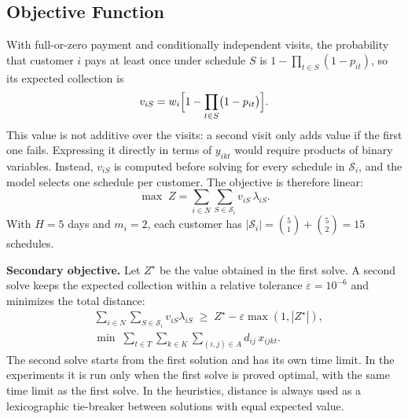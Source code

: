 \documentclass[11pt,a4paper]{article}
\begin{document}
\subsection{Objective Function}
With full-or-zero payment and conditionally independent visits, the
probability that customer $i$ pays at least once under schedule $S$ is
$1-\prod_{t\in S}(1-p_{it})$, so its expected collection is
\begin{equation}
v_{iS}=w_i\Bigl[1-\prod_{t\in S}\bigl(1-p_{it}\bigr)\Bigr].
\label{eq:schedule-value}
\end{equation}
This value is not additive over the visits: a second visit only adds value
if the first one fails. Expressing it directly in terms of $y_{ikt}$ would
require products of binary variables. Instead, $v_{iS}$ is computed before
solving for every schedule in $\mathcal S_i$, and the model selects one
schedule per customer. The objective is therefore linear:
\begin{equation}
\max\; Z=\sum_{i\in N}\sum_{S\in\mathcal S_i} v_{iS}\,\lambda_{iS}.
\label{eq:objective}
\end{equation}
With $H=5$ days and $m_i=2$, each customer has
$|\mathcal S_i|=\binom51+\binom52=15$ schedules.

\textbf{Secondary objective.} Let $Z^\star$ be the value obtained in the first
solve. A second solve keeps the expected collection within a relative
tolerance $\varepsilon=10^{-6}$ and minimizes the total distance:
\begin{align}
&\sum_{i\in N}\sum_{S\in\mathcal S_i} v_{iS}\lambda_{iS}
  \;\ge\; Z^\star-\varepsilon\max(1,|Z^\star|), \label{eq:lexi}\\
&\min\;\sum_{t\in T}\sum_{k\in K}\sum_{(i,j)\in A} d_{ij}\,x_{ijkt}.
  \label{eq:distance}
\end{align}
The second solve starts from the first solution and has its own time limit.
In the experiments it is run only when the first solve is proved optimal,
with the same time limit as the first solve. In the heuristics, distance is always used as a lexicographic
tie-breaker between solutions with equal expected value.
\end{document}

